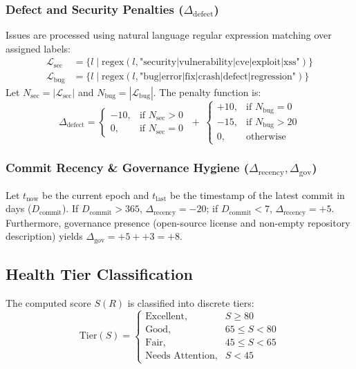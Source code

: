\documentclass[conference]{IEEEtran}
\begin{document}
\subsubsection{Defect and Security Penalties ($\Delta_{\text{defect}}$)}
Issues are processed using natural language regular expression matching over assigned labels:
\begin{align}
\mathcal{L}_{\text{sec}} &= \{ l \mid \text{regex}(l, \text{"security|vulnerability|cve|exploit|xss"}) \} \\
\mathcal{L}_{\text{bug}} &= \{ l \mid \text{regex}(l, \text{"bug|error|fix|crash|defect|regression"}) \}
\end{align}
Let $N_{\text{sec}} = |\mathcal{L}_{\text{sec}}|$ and $N_{\text{bug}} = |\mathcal{L}_{\text{bug}}|$. The penalty function is:
\begin{equation}
\Delta_{\text{defect}} = \begin{cases}
-10, & \text{if } N_{\text{sec}} > 0 \\
0,   & \text{if } N_{\text{sec}} = 0
\end{cases} 
\;+\;
\begin{cases}
+10, & \text{if } N_{\text{bug}} = 0 \\
-15, & \text{if } N_{\text{bug}} > 20 \\
0,   & \text{otherwise}
\end{cases}
\end{equation}

\subsubsection{Commit Recency \& Governance Hygiene ($\Delta_{\text{recency}}, \Delta_{\text{gov}}$)}
Let $t_{\text{now}}$ be the current epoch and $t_{\text{last}}$ be the timestamp of the latest commit in days ($D_{\text{commit}}$). If $D_{\text{commit}} > 365$, $\Delta_{\text{recency}} = -20$; if $D_{\text{commit}} < 7$, $\Delta_{\text{recency}} = +5$. Furthermore, governance presence (open-source license and non-empty repository description) yields $\Delta_{\text{gov}} = +5 + +3 = +8$.

\subsection{Health Tier Classification}
The computed score $S(R)$ is classified into discrete tiers:
\begin{equation}
\text{Tier}(S) = \begin{cases}
\text{Excellent}, & S \ge 80 \\
\text{Good},      & 65 \le S < 80 \\
\text{Fair},      & 45 \le S < 65 \\
\text{Needs Attention}, & S < 45
\end{cases}
\end{equation}
\end{document}
